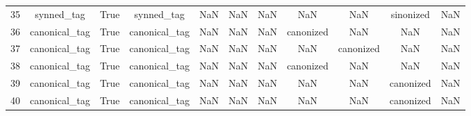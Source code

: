 \begin{table}[h!]
{\begin{tabular}{|c|c|c|c|c|c|c|c|c|c|c|}
         35 &                synned\_tag &                              True &                   synned\_tag &                                  NaN &                                  NaN &                                  NaN &                                  NaN &                                  NaN &                            sinonized &                                                NaN \\
         36 &             canonical\_tag &                              True &                canonical\_tag &                                  NaN &                                  NaN &                                  NaN &                            canonized &                                  NaN &                                  NaN &                                                NaN \\
         37 &             canonical\_tag &                              True &                canonical\_tag &                                  NaN &                                  NaN &                                  NaN &                                  NaN &                            canonized &                                  NaN &                                                NaN \\
         38 &             canonical\_tag &                              True &                canonical\_tag &                                  NaN &                                  NaN &                                  NaN &                            canonized &                                  NaN &                                  NaN &                                                NaN \\
         39 &             canonical\_tag &                              True &                canonical\_tag &                                  NaN &                                  NaN &                                  NaN &                                  NaN &                                  NaN &                            canonized &                                                NaN \\
         40 &             canonical\_tag &                              True &                canonical\_tag &                                  NaN &                                  NaN &                                  NaN &                                  NaN &                                  NaN &                            canonized &                                                NaN \\

\end{tabular}}
\end{table}
